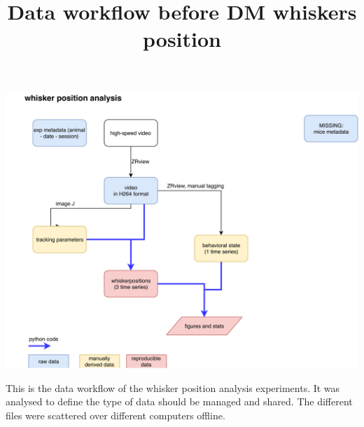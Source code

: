 \documentclass[]{article}
\title{Data workflow before DM whiskers position}
\author{}
\date{}
\begin{document}
\maketitle

\includegraphics{static/fortests_ResultGallery/figures/Data_workflow_before_DM_wh/Data_workflow_before_DM_wh.png}

This is the data workflow of the whisker position analysis experiments.
It was analysed to define the type of data should be managed and shared.
The different files were scattered over different computers offline.

\newpage
\end{document}
